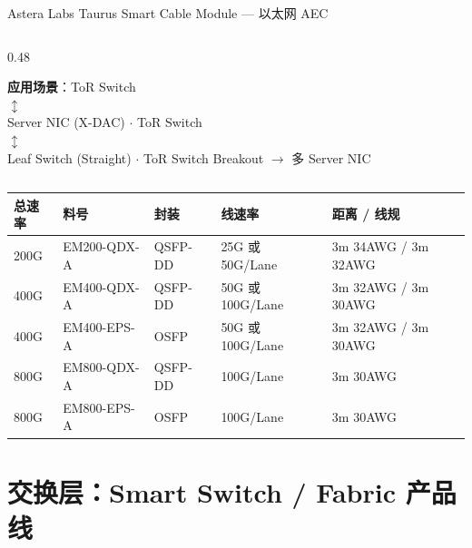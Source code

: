 \documentclass[aspectratio=169, 10pt, UTF8]{ctexbeamer}
\begin{document}
\begin{frame}{Astera Labs Taurus Smart Cable Module — 以太网 AEC}
\begin{columns}[T]
\begin{column}{0.48\textwidth}
    \vspace{4pt}
    \begin{center}
      \textbf{应用场景}：ToR Switch \\ $\updownarrow$ \\Server NIC (X-DAC) $\cdot$ ToR Switch \\ $\updownarrow$ \\ Leaf Switch (Straight) $\cdot$ ToR Switch Breakout $\to$ 多 Server NIC
      \end{center}
    \end{column}

  \end{columns}

  \vspace{4pt}
  \centering
  \scriptsize
  \begin{tabularx}{\textwidth}{p{1.0cm} p{2.6cm} p{2.2cm} p{3.2cm} p{3.4cm}}
    \toprule
    \textbf{总速率} & \textbf{料号} & \textbf{封装} & \textbf{线速率} & \textbf{距离 / 线规} \\
    \midrule
    200G & EM200-QDX-A & QSFP-DD   & 25G 或 50G/Lane & 3m 34AWG / 3m 32AWG \\
    400G & EM400-QDX-A & QSFP-DD   & 50G 或 100G/Lane & 3m 32AWG / 3m 30AWG \\
    400G & EM400-EPS-A & OSFP      & 50G 或 100G/Lane & 3m 32AWG / 3m 30AWG \\
    800G & EM800-QDX-A & QSFP-DD   & 100G/Lane       & 3m 30AWG \\
    800G & EM800-EPS-A & OSFP      & 100G/Lane       & 3m 30AWG \\
    \bottomrule
  \end{tabularx}


\end{frame}

\section{交换层：Smart Switch / Fabric 产品线}
\end{document}
